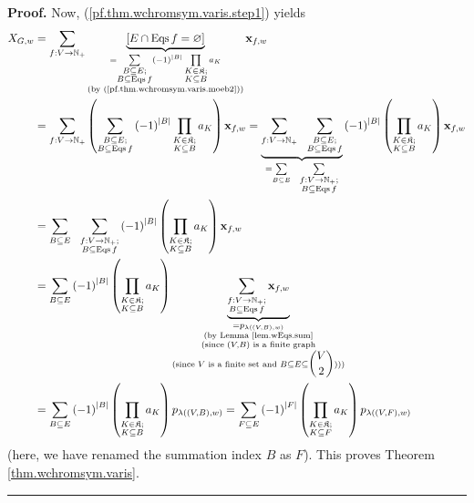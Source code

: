 \documentclass[numbers=enddot,12pt,final,onecolumn,notitlepage]{scrartcl}%
\theoremstyle{definition}
\newenvironment{proof}[1][Proof]{\noindent\textbf{#1.} }{\ \rule{0.5em}{0.5em}}
\newenvironment{verlong}{}{}
\let\sumnonlimits\sum
\let\prodnonlimits\prod
\renewcommand{\sum}{\sumnonlimits\limits}
\renewcommand{\prod}{\prodnonlimits\limits}
\begin{document}
\begin{verlong}
\begin{proof}
Now, (\ref{pf.thm.wchromsym.varis.step1}) yields%
\begin{align*}
X_{G,w}  &  =\sum_{f:V\rightarrow\mathbb{N}_{+}}\underbrace{\left[
E\cap\operatorname*{Eqs}f=\varnothing\right]  }_{\substack{=\sum
_{\substack{B\subseteq E;\\B\subseteq\operatorname*{Eqs}f}}\left(  -1\right)
^{\left\vert B\right\vert }\prod_{\substack{K\in\mathfrak{K};\\K\subseteq
B}}a_{K}\\\text{(by (\ref{pf.thm.wchromsym.varis.moeb2}))}}}\mathbf{x}_{f,w}\\
&  =\sum_{f:V\rightarrow\mathbb{N}_{+}}\left(  \sum_{\substack{B\subseteq
E;\\B\subseteq\operatorname*{Eqs}f}}\left(  -1\right)  ^{\left\vert
B\right\vert }\prod_{\substack{K\in\mathfrak{K};\\K\subseteq B}}a_{K}\right)
\mathbf{x}_{f,w}=\underbrace{\sum_{f:V\rightarrow\mathbb{N}_{+}}%
\ \ \sum_{\substack{B\subseteq E;\\B\subseteq\operatorname*{Eqs}f}}}%
_{=\sum_{B\subseteq E}\ \ \sum_{\substack{f:V\rightarrow\mathbb{N}%
_{+};\\B\subseteq\operatorname*{Eqs}f}}}\left(  -1\right)  ^{\left\vert
B\right\vert }\left(  \prod_{\substack{K\in\mathfrak{K};\\K\subseteq B}%
}a_{K}\right)  \mathbf{x}_{f,w}\\
&  =\sum_{B\subseteq E}\ \ \sum_{\substack{f:V\rightarrow\mathbb{N}%
_{+};\\B\subseteq\operatorname*{Eqs}f}}\left(  -1\right)  ^{\left\vert
B\right\vert }\left(  \prod_{\substack{K\in\mathfrak{K};\\K\subseteq B}%
}a_{K}\right)  \mathbf{x}_{f,w}\\
&  =\sum_{B\subseteq E}\left(  -1\right)  ^{\left\vert B\right\vert }\left(
\prod_{\substack{K\in\mathfrak{K};\\K\subseteq B}}a_{K}\right)
\underbrace{\sum_{\substack{f:V\rightarrow\mathbb{N}_{+};\\B\subseteq
\operatorname*{Eqs}f}}\mathbf{x}_{f,w}}_{\substack{=p_{\lambda\left(  \left(
V,B\right)  ,w\right)  }\\\text{(by Lemma \ref{lem.wEqs.sum}}\\\text{(since
}\left(  V,B\right)  \text{ is a finite graph}\\\text{(since }V\text{ is a
finite set and }B\subseteq E\subseteq\dbinom{V}{2}\text{)))}}}\\
&  =\sum_{B\subseteq E}\left(  -1\right)  ^{\left\vert B\right\vert }\left(
\prod_{\substack{K\in\mathfrak{K};\\K\subseteq B}}a_{K}\right)  p_{\lambda
\left(  \left(  V,B\right)  ,w\right)  }=\sum_{F\subseteq E}\left(  -1\right)
^{\left\vert F\right\vert }\left(  \prod_{\substack{K\in\mathfrak{K}%
;\\K\subseteq F}}a_{K}\right)  p_{\lambda\left(  \left(  V,F\right)
,w\right)  }%
\end{align*}
(here, we have renamed the summation index $B$ as $F$). This proves Theorem
\ref{thm.wchromsym.varis}.
\end{proof}


\end{verlong}
\end{document}
